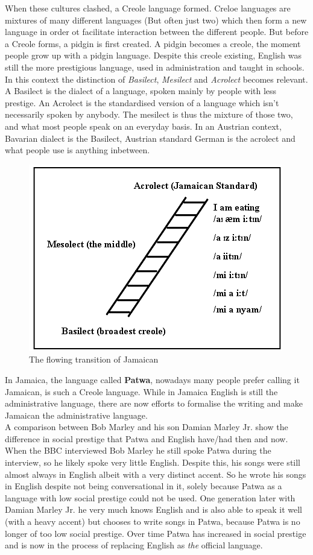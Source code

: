 \documentclass{article}
\begin{document}
	When these cultures clashed, a Creole language formed. Creloe languages are mixtures of many different languages (But often just two) which then form a new language in order ot facilitate interaction between the different people. But before a Creole forms, a pidgin is first created. A pidgin becomes a creole, the moment people grow up with a pidgin language. Despite this creole existing, English was still the more prestigious language, used in administration and taught in schools. \\
	In this context the distinction of \textit{Basilect}, \textit{Mesilect} and \textit{Acrolect} becomes relevant. 
	A Basilect is the dialect of a language, spoken mainly by people with less prestige. An Acrolect is the standardised version of a language which isn't necessarily spoken by anybody. The mesilect is thus the mixture of those two, and what most people speak on an everyday basis. In an Austrian context, Bavarian dialect is the Basilect, Austrian standard German is the acrolect and what people use is anything inbetween. \\
	\begin{figure}
	\includegraphics[scale=0.6]{Images/Jamaican.png}
	\caption{The flowing transition of Jamaican}
	\end{figure}
	In Jamaica, the language called \textbf{Patwa}, nowadays many people prefer calling it Jamaican, is such a Creole language. While in Jamaica English is still the administrative language, there are now efforts to formalise the writing and make Jamaican the administrative language. \\
	A comparison between Bob Marley and his son Damian Marley Jr. show the difference in social prestige that Patwa and English have/had then and now. When the BBC interviewed Bob Marley he still spoke Patwa during the interview, so he likely spoke very little English. Despite this, his songs were still almost always in English albeit with a very distinct accent. So he wrote his songs in English despite not being conversational in it, solely because Patwa as a language with low social prestige could not be used. One generation later with Damian Marley Jr. he very much knows English and is also able to speak it well (with a heavy accent) but chooses to write songs in Patwa, because Patwa is no longer of too low social prestige. Over time Patwa has increased in social prestige and is now in the process of replacing English as \textit{the} official language.
\end{document}
